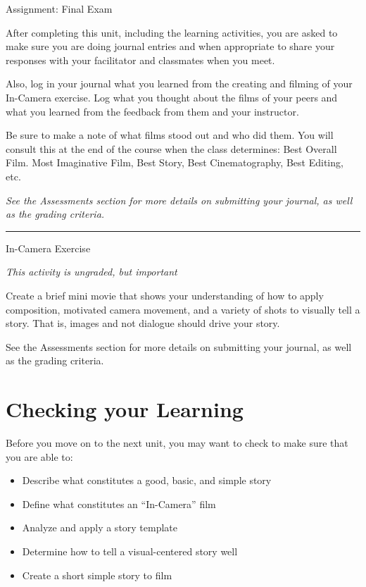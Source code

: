 \documentclass[
]{book}
\providecommand{\tightlist}{%
  \setlength{\itemsep}{0pt}\setlength{\parskip}{0pt}}
\begin{document}
\begin{assessment}
{Assignment: Final Exam}

After completing this unit, including the learning activities, you are asked to make sure you are doing journal entries and when appropriate to share your responses with your facilitator and classmates when you meet.

Also, log in your journal what you learned from the creating and filming of your In-Camera exercise. Log what you thought about the films of your peers and what you learned from the feedback from them and your instructor.

Be sure to make a note of what films stood out and who did them. You will consult this at the end of the course when the class determines: Best Overall Film. Most Imaginative Film, Best Story, Best Cinematography, Best Editing, etc.

\emph{See the Assessments section for more details on submitting your journal, as well as the grading criteria.}

\begin{center}\rule{0.5\linewidth}{0.5pt}\end{center}

{In-Camera Exercise}

\emph{This activity is ungraded, but important}

Create a brief mini movie that shows your understanding of how to apply composition, motivated camera movement, and a variety of shots to visually tell a story. That is, images and not dialogue should drive your story.

See the Assessments section for more details on submitting your journal, as well as the grading criteria.
\end{assessment}

\hypertarget{checking-your-learning-5}{%
\section*{Checking your Learning}\label{checking-your-learning-5}}

\begin{progress}
Before you move on to the next unit, you may want to check to make sure that you are able to:

\begin{itemize}
\tightlist
\item
  Describe what constitutes a good, basic, and simple story\\
\item
  Define what constitutes an ``In-Camera'' film\\
\item
  Analyze and apply a story template\\
\item
  Determine how to tell a visual-centered story well\\
\item
  Create a short simple story to film
\end{itemize}
\end{progress}
\end{document}
